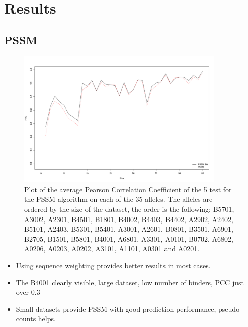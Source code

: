 \documentclass[presentation]{beamer}   %
\begin{document}
\section{Results}
\begin{frame}

\end{frame}

\subsection{PSSM}
\begin{frame}
 \begin{figure}[ht]
  \begin{center}
   \includegraphics[width=10cm]{fig/pssmLN1.pdf}
   \caption{Plot of the average Pearson Correlation Coefficient of the 5 test for the PSSM algorithm on each of the 35 alleles. The alleles are ordered by the size of the dataset, the order is the following:
	B5701, A3002, A2301, B4501, B1801, B4002, B4403, B4402, A2902, A2402, B5101, A2403, B5301, B5401, A3001, A2601, B0801, B3501, A6901, B2705, B1501, B5801, B4001, A6801, A3301, A0101, B0702, A6802, A0206, A0203, A0202, A3101, A1101, A0301 and A0201.}\label{fig:pssm1}
  \end{center}
 \end{figure}
\begin{itemize}
\item<1> Using sequence weighting provides better results in most cases.
\item<2> The B4001 clearly visible, large dataset, low number of binders, PCC just over 0.3
\item<3> Small datasets provide PSSM with good prediction performance, pseudo counts helps.
\end{itemize}
\end{frame}
\end{document}
